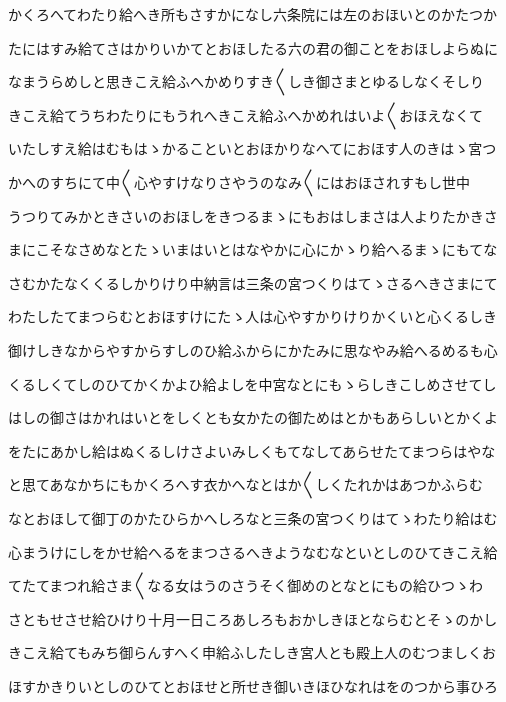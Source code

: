 \documentclass[a4paper,11pt,landscape]{ltjtarticle}
\begin{document}
\par\medskip
かくろへてわたり給へき所もさすかになし六条院には左のおほいとのかたつか
\par\medskip
たにはすみ給てさはかりいかてとおほしたる六の君の御ことをおほしよらぬに
\par\medskip
なまうらめしと思きこえ給ふへかめりすき〱しき御さまとゆるしなくそしり
\par\medskip
きこえ給てうちわたりにもうれへきこえ給ふへかめれはいよ〱おほえなくて
\par\medskip
いたしすえ給はむもはゝかることいとおほかりなへてにおほす人のきはゝ宮つ
\par\medskip
かへのすちにて中〱心やすけなりさやうのなみ〱にはおほされすもし世中
\par\medskip
うつりてみかときさいのおほしをきつるまゝにもおはしまさは人よりたかきさ
\par\medskip
まにこそなさめなとたゝいまはいとはなやかに心にかゝり給へるまゝにもてな
\par\medskip
さむかたなくくるしかりけり中納言は三条の宮つくりはてゝさるへきさまにて
\par\medskip
わたしたてまつらむとおほすけにたゝ人は心やすかりけりかくいと心くるしき
\par\medskip
御けしきなからやすからすしのひ給ふからにかたみに思なやみ給へるめるも心
\par\medskip
くるしくてしのひてかくかよひ給よしを中宮なとにもゝらしきこしめさせてし
\par\medskip
はしの御さはかれはいとをしくとも女かたの御ためはとかもあらしいとかくよ
\par\medskip
をたにあかし給はぬくるしけさよいみしくもてなしてあらせたてまつらはやな
\par\medskip
と思てあなかちにもかくろへす衣かへなとはか〱しくたれかはあつかふらむ
\par\medskip
なとおほして御丁のかたひらかへしろなと三条の宮つくりはてゝわたり給はむ
\par\medskip
心まうけにしをかせ給へるをまつさるへきようなむなといとしのひてきこえ給
\par\medskip
てたてまつれ給さま〱なる女はうのさうそく御めのとなとにもの給ひつゝわ
\par\medskip
さともせさせ給ひけり十月一日ころあしろもおかしきほとならむとそゝのかし
\par\medskip
きこえ給てもみち御らんすへく申給ふしたしき宮人とも殿上人のむつましくお
\par\medskip
ほすかきりいとしのひてとおほせと所せき御いきほひなれはをのつから事ひろ
\par\medskip
\end{document}
